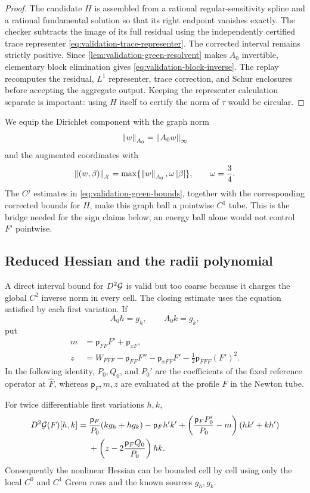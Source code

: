 \begin{proof}
The candidate $H$ is assembled from a rational regular-sensitivity spline and
a rational fundamental solution so that its right endpoint vanishes exactly.
The checker subtracts the image of its full residual using the independently
certified trace representer \eqref{eq:validation-trace-representer}.  The
corrected interval remains strictly positive.  Since
\cref{lem:validation-green-resolvent} makes $A_0$ invertible, elementary block
elimination gives \eqref{eq:validation-block-inverse}.  The replay recomputes
the residual, $L^1$ representer, trace correction, and Schur enclosures before
accepting the aggregate output.  Keeping the representer calculation separate
is important: using $H$ itself to certify the norm of $\tau$ would be
circular.
\end{proof}

We equip the Dirichlet component with the graph norm
\[
 \left\lVert w\right\rVert_{A_0}=\left\lVert A_0w\right\rVert_{\infty}
\]
and the augmented coordinates with
\begin{equation}
 \left\lVert(w,\beta)\right\rVert_{\mathcal X}
   =\max\{\left\lVert w\right\rVert_{A_0},\omega\left\lvert\beta\right\rvert\},
 \qquad \omega=\frac34.
 \label{eq:validation-product-norm}
\end{equation}
The $C^j$ estimates in \eqref{eq:validation-green-bounds}, together with the
corresponding corrected bounds for $H$, make this graph ball a pointwise
$C^1$ tube.  This is the bridge needed for the sign claims below; an energy
ball alone would not control $F'$ pointwise.

\subsection{Reduced Hessian and the radii polynomial}

A direct interval bound for $D^2\mathcal G$ is valid but too coarse because it charges
the global $C^2$ inverse norm in every cell.  The closing estimate uses the
equation satisfied by each first variation.  If
\[
 A_0h=g_h,\qquad A_0k=g_k,
\]
put
\begin{align*}
 m&=\mathsf p_{FF}F'+\mathsf p_{xF},\\
 z&=W_{FFF}-\mathsf p_{FF}F''-\mathsf p_{xFF}F'
       -\frac12\mathsf p_{FFF}(F')^2.
\end{align*}
In the following identity, $P_0,Q_0$, and $P_0'$ are the coefficients of the
fixed reference operator at $\widehat F$, whereas
$\mathsf p_F,m,z$ are evaluated at the profile $F$ in the Newton tube.

\begin{lemma}
\label{lem:validation-reduced-hessian}
For twice differentiable first variations $h,k$,
\begin{align}
 D^2\mathcal G(F)[h,k]
  ={}&\frac{\mathsf p_F}{P_0}(k g_h+h g_k)-\mathsf p_Fh'k'
  +\left(\frac{\mathsf p_FP_0'}{P_0}-m\right)(hk'+kh')
 \nonumber\\
 &+\left(z-2\frac{\mathsf p_FQ_0}{P_0}\right)hk.
 \label{eq:validation-reduced-hessian}
\end{align}
Consequently the nonlinear Hessian can be bounded cell by cell using only
the local $C^0$ and $C^1$ Green rows and the known sources $g_h,g_k$.
\end{lemma}

